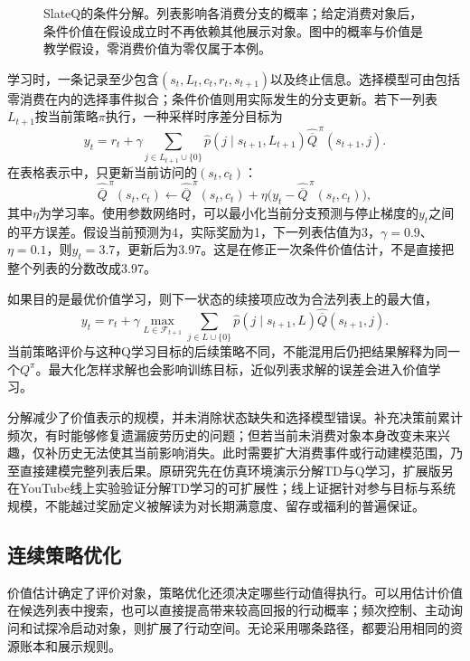 \begin{figure}[htbp]
 \centering
 
 \caption{SlateQ的条件分解。列表影响各消费分支的概率；给定消费对象后，条件价值在假设成立时不再依赖其他展示对象。图中的概率与价值是教学假设，零消费价值为零仅属于本例。}
 \label{fig:rs-long-term-slateq}
\end{figure}

学习时，一条记录至少包含$(s_t,L_t,c_t,r_t,s_{t+1})$以及终止信息。选择模型可由包括零消费在内的选择事件拟合；条件价值则用实际发生的分支更新。若下一列表$L_{t+1}$按当前策略$\pi$执行，一种采样时序差分目标为
\[
 y_t=r_t+\gamma
 \sum_{j\in L_{t+1}\cup\{0\}}
 \widehat p(j\mid s_{t+1},L_{t+1})
 \widehat{\overline Q}^{\,\pi}(s_{t+1},j).
\]
在表格表示中，只更新当前访问的$(s_t,c_t)$：
\[
 \widehat{\overline Q}^{\,\pi}(s_t,c_t)
 \leftarrow
 \widehat{\overline Q}^{\,\pi}(s_t,c_t)
 +\eta\bigl(y_t-\widehat{\overline Q}^{\,\pi}(s_t,c_t)\bigr),
\]
其中$\eta$为学习率。使用参数网络时，可以最小化当前分支预测与停止梯度的$y_t$之间的平方误差。假设当前预测为4，实际奖励为1，下一列表估值为3，$\gamma=0.9$、$\eta=0.1$，则$y_t=3.7$，更新后为3.97。这是在修正一次条件价值估计，不是直接把整个列表的分数改成3.97。

如果目的是最优价值学习，则下一状态的续接项应改为合法列表上的最大值，
\[
 y_t=r_t+\gamma\max_{L\in\mathcal{F}_{t+1}}
 \sum_{j\in L\cup\{0\}}
 \widehat p(j\mid s_{t+1},L)
 \widehat{\overline Q}(s_{t+1},j).
\]
当前策略评价与这种Q学习目标的后续策略不同，不能混用后仍把结果解释为同一个$Q^\pi$。最大化怎样求解也会影响训练目标，近似列表求解的误差会进入价值学习。

分解减少了价值表示的规模，并未消除状态缺失和选择模型错误。补充决策前累计频次，有时能够修复遗漏疲劳历史的问题；但若当前未消费对象本身改变未来兴趣，仅补历史无法使其当前影响消失。此时需要扩大消费事件或行动建模范围，乃至直接建模完整列表后果。原研究先在仿真环境演示分解TD与Q学习，扩展版另在YouTube线上实验验证分解TD学习的可扩展性；线上证据针对参与目标与系统规模，不能越过奖励定义被解读为对长期满意度、留存或福利的普遍保证。

\subsection{连续策略优化}
\label{sec:rs-sequential-policy}

价值估计确定了评价对象，策略优化还须决定哪些行动值得执行。可以用估计价值在候选列表中搜索，也可以直接提高带来较高回报的行动概率；频次控制、主动询问和试探冷启动对象，则扩展了行动空间。无论采用哪条路径，都要沿用相同的资源账本和展示规则。

